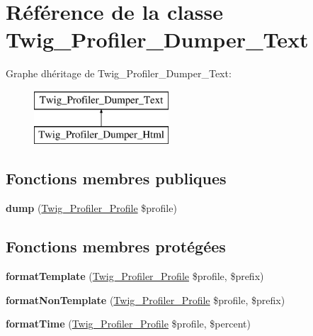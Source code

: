 \hypertarget{class_twig___profiler___dumper___text}{}\section{Référence de la classe Twig\+\_\+\+Profiler\+\_\+\+Dumper\+\_\+\+Text}
\label{class_twig___profiler___dumper___text}
Graphe d\textquotesingle{}héritage de Twig\+\_\+\+Profiler\+\_\+\+Dumper\+\_\+\+Text\+:\begin{figure}[H]
\begin{center}
\leavevmode
\includegraphics[height=2.000000cm]{class_twig___profiler___dumper___text}
\end{center}
\end{figure}
\subsection*{Fonctions membres publiques}
\begin{DoxyCompactItemize}
\item 
{\bfseries dump} (\hyperlink{class_twig___profiler___profile}{Twig\+\_\+\+Profiler\+\_\+\+Profile} \$profile)\hypertarget{class_twig___profiler___dumper___text_a6c5847be5fe44203b20ccca8ce59c05b}{}\label{class_twig___profiler___dumper___text_a6c5847be5fe44203b20ccca8ce59c05b}

\end{DoxyCompactItemize}
\subsection*{Fonctions membres protégées}
\begin{DoxyCompactItemize}
\item 
{\bfseries format\+Template} (\hyperlink{class_twig___profiler___profile}{Twig\+\_\+\+Profiler\+\_\+\+Profile} \$profile, \$prefix)\hypertarget{class_twig___profiler___dumper___text_a02c170148566e209ced5cdf1b743418b}{}\label{class_twig___profiler___dumper___text_a02c170148566e209ced5cdf1b743418b}

\item 
{\bfseries format\+Non\+Template} (\hyperlink{class_twig___profiler___profile}{Twig\+\_\+\+Profiler\+\_\+\+Profile} \$profile, \$prefix)\hypertarget{class_twig___profiler___dumper___text_aa1161e3f32546d26391304d787264ddd}{}\label{class_twig___profiler___dumper___text_aa1161e3f32546d26391304d787264ddd}

\item 
{\bfseries format\+Time} (\hyperlink{class_twig___profiler___profile}{Twig\+\_\+\+Profiler\+\_\+\+Profile} \$profile, \$percent)\hypertarget{class_twig___profiler___dumper___text_ae1ea1c70a40a31c730fd4cc049f31425}{}\label{class_twig___profiler___dumper___text_ae1ea1c70a40a31c730fd4cc049f31425}

\end{DoxyCompactItemize}


